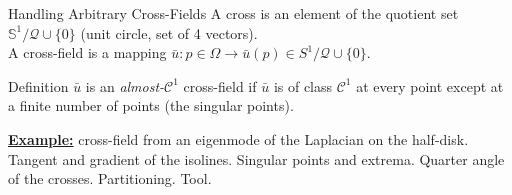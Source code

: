 \documentclass[compress,10pt,aspectratio=169]{beamer}
\begin{document}
\begin{frame}{Handling Arbitrary Cross-Fields}
\small
A {\color{onera}cross} is an element of the quotient set $\mathbb{S}^1/\mathcal{Q}\cup\{0\}$ {\color{onera_gray}(unit circle, set of 4 vectors)}.\\\vspace{0.2cm}
A {\color{onera}cross-field} is a mapping $\bar{u}:p\in\Omega\rightarrow \bar{u}(p)\in S^1/\mathcal{Q}\cup\{0\}$.\\\vspace{0.2cm}

\begin{onerablock}{\small Definition}
\small
$\bar{u}$ is an \emph{almost-$\mathcal{C}^1$} cross-field if $\bar{u}$ is of class $\mathcal{C}^1$ at every point except at a finite number of points {\color{onera_gray}(the singular points)}.
\end{onerablock}

{\bf\underline{Example:}} {\color{onera_gray} cross-field from an eigenmode of the Laplacian on the half-disk. Tangent and gradient of the isolines. Singular points and extrema. Quarter angle of the crosses. Partitioning. Tool.}


\end{frame}
\end{document}
